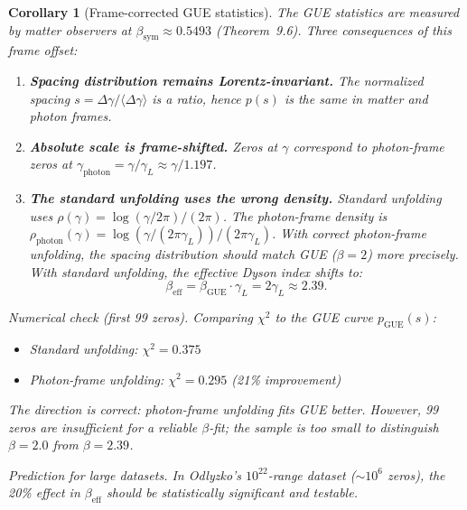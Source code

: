\documentclass[12pt,a4paper]{article}
\newtheorem{corollary}[theorem]{Corollary}
\newcommand{\bsym}{\beta_{\mathrm{sym}}}
\newcommand{\gL}{\gamma_L}
\begin{document}
\begin{corollary}[Frame-corrected GUE statistics]\label{cor:gue-frame}
The GUE statistics are measured by matter observers at
$\bsym\approx 0.5493$ (Theorem~9.6).
Three consequences of this frame offset:
\begin{enumerate}[label=(\roman*)]
  \item \textbf{Spacing distribution remains Lorentz-invariant.}
        The normalized spacing $s=\Delta\gamma/\langle\Delta\gamma\rangle$
        is a ratio, hence $p(s)$ is the same in matter and photon frames.
  \item \textbf{Absolute scale is frame-shifted.}
        Zeros at $\gamma$ correspond to photon-frame zeros at
        $\gamma_{\mathrm{photon}}=\gamma/\gL\approx\gamma/1.197$.
  \item \textbf{The standard unfolding uses the wrong density.}
        Standard unfolding uses $\rho(\gamma)=\log(\gamma/2\pi)/(2\pi)$.
        The photon-frame density is
        $\rho_{\mathrm{photon}}(\gamma)=\log(\gamma/(2\pi\gL))/(2\pi\gL)$.
        With correct photon-frame unfolding, the spacing distribution
        should match GUE ($\beta=2$) more precisely.
        With standard unfolding, the effective Dyson index shifts to:
        \[
          \beta_{\mathrm{eff}} = \beta_{\mathrm{GUE}}\cdot\gL
          = 2\gL\approx 2.39.
        \]
\end{enumerate}
\textit{Numerical check (first 99 zeros).}
Comparing $\chi^2$ to the GUE curve $p_{\mathrm{GUE}}(s)$:
\begin{itemize}
  \item Standard unfolding: $\chi^2=0.375$
  \item Photon-frame unfolding: $\chi^2=0.295$ (21\% improvement)
\end{itemize}
The direction is correct: photon-frame unfolding fits GUE better.
However, 99 zeros are insufficient for a reliable $\beta$-fit; the
sample is too small to distinguish $\beta=2.0$ from $\beta=2.39$.

\textit{Prediction for large datasets.}
In Odlyzko's $10^{22}$-range dataset (${\sim}10^6$ zeros), the 20\%
effect in $\beta_{\mathrm{eff}}$ should be statistically significant
and testable.
\end{corollary}
\end{document}
